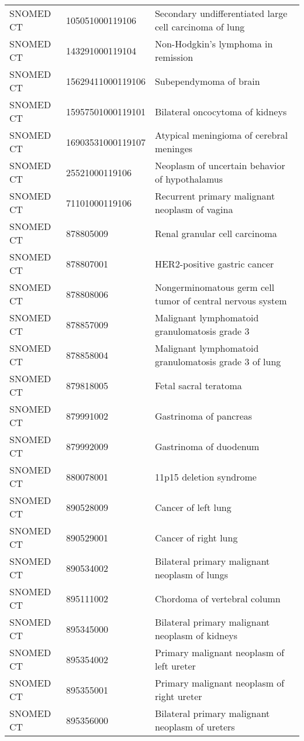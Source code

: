 \begin{longtable}{p{}p{}p{}}
  SNOMED CT & 105051000119106 & Secondary undifferentiated large cell carcinoma of lung \\ 
  SNOMED CT & 143291000119104 & Non-Hodgkin's lymphoma in remission \\ 
  SNOMED CT & 15629411000119106 & Subependymoma of brain \\ 
  SNOMED CT & 15957501000119101 & Bilateral oncocytoma of kidneys \\ 
  SNOMED CT & 16903531000119107 & Atypical meningioma of cerebral meninges \\ 
  SNOMED CT & 25521000119106 & Neoplasm of uncertain behavior of hypothalamus \\ 
  SNOMED CT & 71101000119106 & Recurrent primary malignant neoplasm of vagina \\ 
  SNOMED CT & 878805009 & Renal granular cell carcinoma \\ 
  SNOMED CT & 878807001 & HER2-positive gastric cancer \\ 
  SNOMED CT & 878808006 & Nongerminomatous germ cell tumor of central nervous system \\ 
  SNOMED CT & 878857009 & Malignant lymphomatoid granulomatosis grade 3 \\ 
  SNOMED CT & 878858004 & Malignant lymphomatoid granulomatosis grade 3 of lung \\ 
  SNOMED CT & 879818005 & Fetal sacral teratoma \\ 
  SNOMED CT & 879991002 & Gastrinoma of pancreas \\ 
  SNOMED CT & 879992009 & Gastrinoma of duodenum \\ 
  SNOMED CT & 880078001 & 11p15 deletion syndrome \\ 
  SNOMED CT & 890528009 & Cancer of left lung \\ 
  SNOMED CT & 890529001 & Cancer of right lung \\ 
  SNOMED CT & 890534002 & Bilateral primary malignant neoplasm of lungs \\ 
  SNOMED CT & 895111002 & Chordoma of vertebral column \\ 
  SNOMED CT & 895345000 & Bilateral primary malignant neoplasm of kidneys \\ 
  SNOMED CT & 895354002 & Primary malignant neoplasm of left ureter \\ 
  SNOMED CT & 895355001 & Primary malignant neoplasm of right ureter \\ 
  SNOMED CT & 895356000 & Bilateral primary malignant neoplasm of ureters \\ 

\end{longtable}
